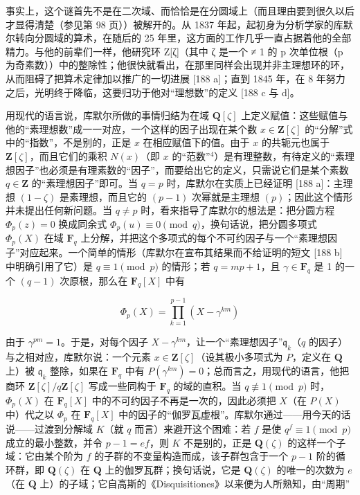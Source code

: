 事实上，这个谜首先不是在二次域、而恰恰是在分圆域上（而且理由要到很久以后才显得清楚（参见第 98 页））被解开的。从 1837 年起，起初身为分析学家的库默尔转向分圆域的算术，在随后的 25 年里，这方面的工作几乎一直占据着他的全部精力。与他的前辈们一样，他研究环 Z{[}ζ{]}（其中 ζ 是一个 ≠ 1 的 p 次单位根（p 为奇素数））中的整除性；他很快就看出，在那里同样会出现并非主理想环的环，从而阻碍了把算术定律加以推广的一切进展 {[}188 a{]}；直到 1845 年，在 8 年努力之后，光明终于降临，这要归功于他对“理想数”的定义 {[}188 c 与 d{]}。

用现代的语言说，库默尔所做的事情归结为在域 \(\mathbf{Q}[\zeta]\) 上定义赋值：这些赋值与他的“素理想数”成一一对应，一个这样的因子出现在某个数 \(x \in \mathbf{Z}[\zeta]\) 的“分解”式中的“指数”，不是别的，正是 \(x\) 在相应赋值下的值。由于 \(x\) 的共轭元也属于 \(\mathbf{Z}[\zeta]\)，而且它们的乘积 \(N(x)\)（即 \(x\) 的“范数”\(^{4}\)）是有理整数，有待定义的“素理想因子”也必须是有理素数的“因子”，而要给出它的定义，只需说它们是某个素数 \(q \in \mathbf{Z}\) 的“素理想因子”即可。当 \(q = p\) 时，库默尔在实质上已经证明 {[}188 a{]}：主理想 \((1 - \zeta)\) 是素理想，而且它的 \((p - 1)\) 次幂就是主理想 \((p)\)；因此这个情形并未提出任何新问题。当 \(q \neq p\) 时，看来指导了库默尔的想法是：把分圆方程 \(\Phi_p(z) = 0\) 换成同余式 \(\Phi_p(u) \equiv 0 \pmod{q}\)，换句话说，把分圆多项式 \(\Phi_p(X)\) 在域 \(\mathbf{F}_q\) 上分解，并把这个多项式的每个不可约因子与一个“素理想因子”对应起来。一个简单的情形（库默尔在宣布其结果而不给证明的短文 {[}188 b{]} 中明确引用了它）是 \(q \equiv 1 \pmod{p}\) 的情形；若 \(q = mp + 1\)，且 \(\gamma \in \mathbf{F}_q\) 是 1 的一个 \((q - 1)\) 次原根，那么在 \(\mathbf{F}_q[X]\) 中有

\[
\Phi_ {p} (X) = \prod_ {k = 1} ^ {p - 1} (X - \gamma^ {k m})
\]

由于 \(\gamma^{pm} = 1\)。于是，对每个因子 \(X - \gamma^{km}\)，让一个“素理想因子”\(\mathfrak{q}_k\)（\(q\) 的因子）与之相对应，库默尔说：一个元素 \(x \in \mathbf{Z}[\zeta]\)（设其极小多项式为 \(P\)，定义在 \(\mathbf{Q}\) 上）被 \(\mathfrak{q}_k\) 整除，如果在 \(\mathbf{F}_q\) 中有 \(P(\gamma^{km}) = 0\)；总而言之，用现代的语言，他把商环 \(\mathbf{Z}[\zeta]/q\mathbf{Z}[\zeta]\) 写成一些同构于 \(\mathbf{F}_q\) 的域的直积。当 \(q \not\equiv 1 \pmod{p}\) 时，\(\Phi_p(X)\) 在 \(\mathbf{F}_q[X]\) 中的不可约因子不再是一次的，因此必须把 \(X\)（在 \(P(X)\) 中）代之以 \(\Phi_p\) 在 \(\mathbf{F}_q[X]\) 中的因子的“伽罗瓦虚根”。库默尔通过——用今天的话说——过渡到分解域 \(K\)（就 \(q\) 而言）来避开这个困难：若 \(f\) 是使 \(q^f \equiv 1 \pmod{p}\) 成立的最小整数，并令 \(p-1 = ef\)，则 \(K\) 不是别的，正是 \(\mathbf{Q}(\zeta)\) 的这样一个子域：它由某个阶为 \(f\) 的子群的不变量构造而成，该子群包含于一个 \(p-1\) 阶的循环群，即 \(\mathbf{Q}(\zeta)\) 在 \(\mathbf{Q}\) 上的伽罗瓦群；换句话说，它是 \(\mathbf{Q}(\zeta)\) 的唯一的次数为 \(e\)（在 \(\mathbf{Q}\) 上）的子域；它自高斯的《Disquisitiones》以来便为人所熟知，由“周期”

